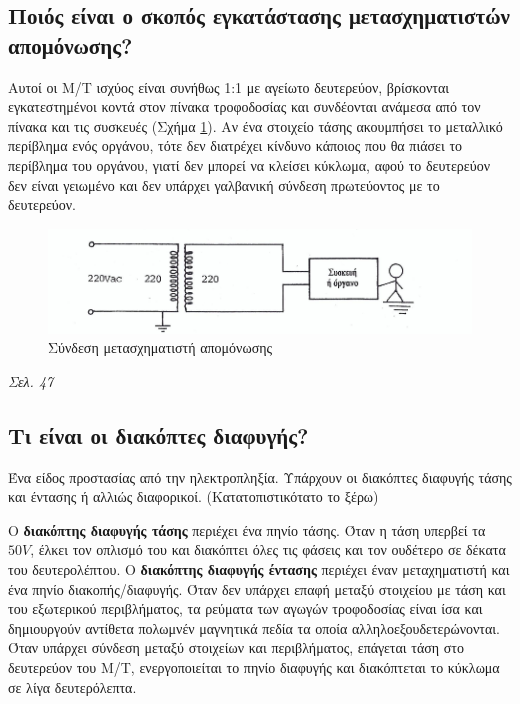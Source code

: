 \documentclass{article}
\begin{document}
\subsection{Ποιός είναι ο σκοπός εγκατάστασης μετασχηματιστών απομόνωσης?}
Αυτοί οι Μ/Τ ισχύος είναι συνήθως 1:1 με αγείωτο δευτερεύον, βρίσκονται εγκατεστημένοι κοντά στον πίνακα τροφοδοσίας και συνδέονται ανάμεσα από τον πίνακα και τις 
συσκευές (Σχήμα \ref{metasximatistisapomonwsis}). Αν ένα στοιχείο τάσης ακουμπήσει το μεταλλικό περίβλημα ενός οργάνου, τότε δεν διατρέχει κίνδυνο κάποιος που θα 
πιάσει το περίβλημα του οργάνου, γιατί δεν μπορεί να κλείσει κύκλωμα, αφού το δευτερεύον δεν είναι γειωμένο και δεν υπάρχει γαλβανική σύνδεση πρωτεύοντος με το 
δευτερεύον.  

\begin{figure}[h!]
    \includegraphics[width=\linewidth]{metasximatistisapomonwsis.png}
    \caption{Σύνδεση μετασχηματιστή απομόνωσης}
    \label{metasximatistisapomonwsis}
\end{figure}

\emph{Σελ. 47}

\subsection{Τι είναι οι διακόπτες διαφυγής?}
Ένα είδος προστασίας από την ηλεκτροπληξία. Υπάρχουν οι διακόπτες διαφυγής τάσης και έντασης ή αλλιώς διαφορικοί. (Κατατοπιστικότατο το ξέρω)

O \textbf{διακόπτης διαφυγής τάσης} περιέχει ένα πηνίο τάσης. Όταν η τάση υπερβεί τα $50V$, έλκει τον οπλισμό του και διακόπτει όλες τις φάσεις και τον ουδέτερο σε
δέκατα του δευτερολέπτου.
O \textbf{διακόπτης διαφυγής έντασης} περιέχει έναν μεταχηματιστή και ένα πηνίο διακοπής/διαφυγής. Όταν δεν υπάρχει επαφή μεταξύ στοιχείου με τάση και του εξωτερικού
περιβλήματος, τα ρεύματα των αγωγών τροφοδοσίας είναι ίσα και δημιουργούν αντίθετα πολωμνέν μαγνητικά πεδία τα οποία αλληλοεξουδετερώνονται. Όταν υπάρχει σύνδεση μεταξύ 
στοιχείων και περιβλήματος, επάγεται τάση στο δευτερεύον του M/T, ενεργοποιείται το πηνίο διαφυγής και διακόπτεται το κύκλωμα σε λίγα δευτερόλεπτα.
\end{document}
